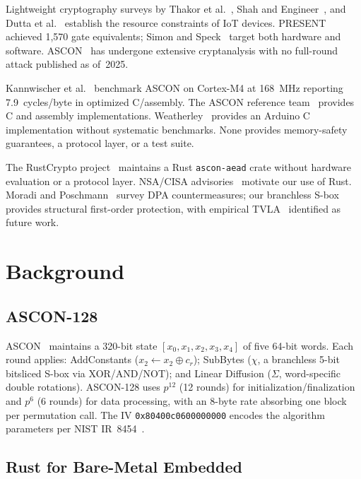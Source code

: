 \documentclass[anonymous]{ndss}
\begin{document}
Lightweight cryptography surveys by Thakor et al.~\cite{b6},
Shah and Engineer~\cite{b7}, and Dutta et al.~\cite{b8} establish the
resource constraints of IoT devices. PRESENT~\cite{b3} achieved 1{,}570 gate
equivalents; Simon and Speck~\cite{b4} target both hardware and software.
ASCON~\cite{b9} has undergone extensive cryptanalysis with no full-round
attack published as of~2025.

Kannwischer et al.~\cite{b10} benchmark ASCON on Cortex-M4 at 168~MHz
reporting 7.9~cycles/byte in optimized C/assembly. The ASCON reference
team~\cite{b12} provides C and assembly implementations. Weatherley~\cite{b11}
provides an Arduino C implementation without systematic benchmarks. None
provides memory-safety guarantees, a protocol layer, or a test suite.

The RustCrypto project~\cite{b17} maintains a Rust \texttt{ascon-aead} crate
without hardware evaluation or a protocol layer. NSA/CISA advisories~\cite{b16}
motivate our use of Rust. Moradi and Poschmann~\cite{b13} survey DPA
countermeasures; our branchless S-box provides structural first-order protection,
with empirical TVLA~\cite{b19} identified as future work.

\section{Background}
\label{sec:background}

\subsection{ASCON-128}

ASCON~\cite{b9} maintains a 320-bit state $[x_0,x_1,x_2,x_3,x_4]$ of five
64-bit words. Each round applies: AddConstants ($x_2 \leftarrow x_2 \oplus c_r$);
SubBytes ($\chi$, a branchless 5-bit bitsliced S-box via XOR/AND/NOT);
and Linear Diffusion ($\Sigma$, word-specific double rotations).
ASCON-128 uses $p^{12}$ (12 rounds) for initialization/finalization and
$p^6$ (6 rounds) for data processing, with an 8-byte rate absorbing one
block per permutation call. The IV \texttt{0x80400c0600000000} encodes
the algorithm parameters per NIST IR~8454~\cite{b5}.

\subsection{Rust for Bare-Metal Embedded}
\end{document}
